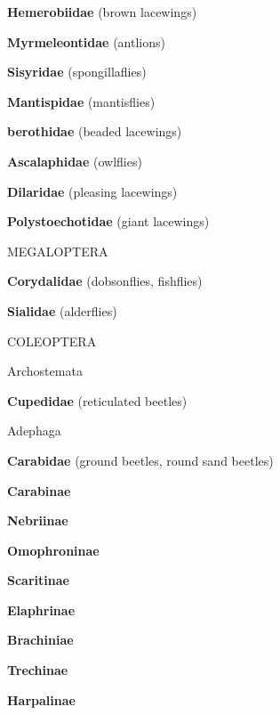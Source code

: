 \documentclass[letterpaper,10pt]{article}
\begin{document}
{\makebox[0.6cm]{}  \textbf{Hemerobiidae} (brown lacewings) \par
\makebox[0.6cm]{}  \textbf{Myrmeleontidae} (antlions) \par
\makebox[0.6cm]{}  \textbf{Sisyridae} (spongillaflies) \par
\makebox[0.6cm]{}  \textbf{Mantispidae} (mantisflies) \par
\makebox[0.6cm]{}  \textbf{berothidae} (beaded lacewings) \par
\makebox[0.6cm]{}  \textbf{Ascalaphidae} (owlflies) \par
\makebox[0.6cm]{}  \textbf{Dilaridae} (pleasing lacewings) \par
\makebox[0.6cm]{}  \textbf{Polystoechotidae} (giant lacewings) \par
%
%
%
\makebox[0.0cm]{}  MEGALOPTERA \par
\makebox[0.6cm]{}  \textbf{Corydalidae} (dobsonflies, fishflies) \par
\makebox[0.6cm]{}  \textbf{Sialidae} (alderflies) \par
%
%
%
\makebox[0.0cm]{}  COLEOPTERA \par
\makebox[0.20cm]{}  Archostemata \par
\makebox[0.6cm]{}  \textbf{Cupedidae} (reticulated beetles) \par
\makebox[0.20cm]{}  Adephaga \par
\makebox[0.6cm]{}  \textbf{Carabidae} (ground beetles, round sand beetles) \par
\makebox[0.8cm]{}  \textbf{Carabinae} \par
\makebox[0.8cm]{}  \textbf{Nebriinae} \par
\makebox[0.8cm]{}  \textbf{Omophroninae} \par
\makebox[0.8cm]{}  \textbf{Scaritinae} \par
\makebox[0.8cm]{}  \textbf{Elaphrinae} \par
\makebox[0.8cm]{}  \textbf{Brachiniae} \par
\makebox[0.8cm]{}  \textbf{Trechinae} \par
\makebox[0.8cm]{}  \textbf{Harpalinae} \par
}
\end{document}
